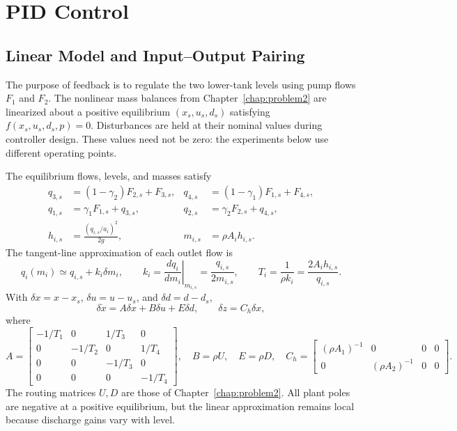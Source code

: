 \chapter{PID Control}
\label{chap:problem3}

\section{Linear Model and Input--Output Pairing}

The purpose of feedback is to regulate the two lower-tank levels using
pump flows $F_1$ and $F_2$. The nonlinear mass balances from
Chapter~\ref{chap:problem2} are linearized about a positive equilibrium
$(x_s,u_s,d_s)$ satisfying $f(x_s,u_s,d_s,p)=0$. Disturbances are held at
their nominal values during controller design. These values need not be
zero: the experiments below use different operating points.

The equilibrium flows, levels, and masses satisfy
\begin{align}
 q_{3,s}&=(1-\gamma_2)F_{2,s}+F_{3,s},&
 q_{4,s}&=(1-\gamma_1)F_{1,s}+F_{4,s},\\
 q_{1,s}&=\gamma_1F_{1,s}+q_{3,s},&
 q_{2,s}&=\gamma_2F_{2,s}+q_{4,s},\\
 h_{i,s}&=\frac{(q_{i,s}/a_i)^2}{2g},&
 m_{i,s}&=\rho A_i h_{i,s}.
\end{align}
The tangent-line approximation of each outlet flow is
\begin{equation}
 q_i(m_i)\simeq q_{i,s}+k_i\delta m_i,\qquad
 k_i=\left.\frac{dq_i}{dm_i}\right|_{m_{i,s}}
     =\frac{q_{i,s}}{2m_{i,s}},\qquad
 T_i=\frac{1}{\rho k_i}=\frac{2A_i h_{i,s}}{q_{i,s}}.
\end{equation}
With $\delta x=x-x_s$, $\delta u=u-u_s$, and $\delta d=d-d_s$,
\begin{equation}
 \delta\dot x=A\delta x+B\delta u+E\delta d,\qquad
 \delta z=C_h\delta x,
\end{equation}
where
\begin{equation}
 A=\begin{bmatrix}
 -1/T_1&0&1/T_3&0\\0&-1/T_2&0&1/T_4\\
 0&0&-1/T_3&0\\0&0&0&-1/T_4
 \end{bmatrix},\quad B=\rho U,\quad E=\rho D,
 \quad C_h=\begin{bmatrix}(\rho A_1)^{-1}&0&0&0\\
 0&(\rho A_2)^{-1}&0&0\end{bmatrix}.
\end{equation}
The routing matrices $U,D$ are those of Chapter~\ref{chap:problem2}.
All plant poles are negative at a positive equilibrium, but the
linear approximation remains local because discharge gains vary with level.

